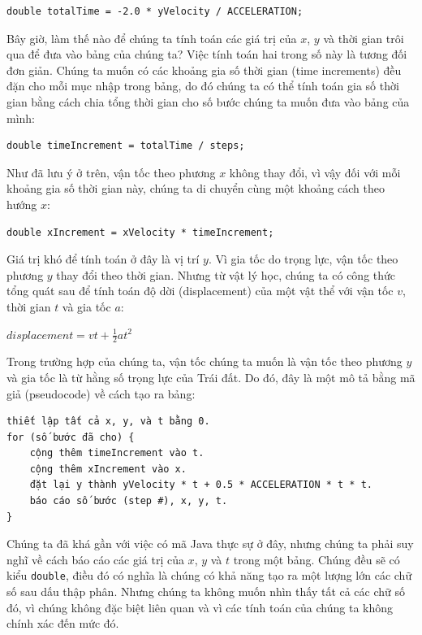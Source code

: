 \begin{verbatim}
double totalTime = -2.0 * yVelocity / ACCELERATION;
\end{verbatim}

Bây giờ, làm thế nào để chúng ta tính toán các giá trị của \(x\), \(y\)
và thời gian trôi qua để đưa vào bảng của chúng ta? Việc tính toán hai
trong số này là tương đối đơn giản. Chúng ta muốn có các khoảng gia số
thời gian (time increments) đều đặn cho mỗi mục nhập trong bảng, do đó
chúng ta có thể tính toán gia số thời gian bằng cách chia tổng thời gian
cho số bước chúng ta muốn đưa vào bảng của mình:

\begin{verbatim}
double timeIncrement = totalTime / steps;
\end{verbatim}

Như đã lưu ý ở trên, vận tốc theo phương \(x\) không thay đổi, vì vậy
đối với mỗi khoảng gia số thời gian này, chúng ta di chuyển cùng một
khoảng cách theo hướng \(x\):

\begin{verbatim}
double xIncrement = xVelocity * timeIncrement;
\end{verbatim}

Giá trị khó để tính toán ở đây là vị trí \(y\). Vì gia tốc do trọng lực,
vận tốc theo phương \(y\) thay đổi theo thời gian. Nhưng từ vật lý học,
chúng ta có công thức tổng quát sau để tính toán độ dời (displacement)
của một vật thể với vận tốc \(v\), thời gian \(t\) và gia tốc \(a\):

\(displacement = v t + \frac{1}{2} a t^2\)

Trong trường hợp của chúng ta, vận tốc chúng ta muốn là vận tốc theo
phương \(y\) và gia tốc là từ hằng số trọng lực của Trái đất. Do đó, đây
là một mô tả bằng mã giả (pseudocode) về cách tạo ra bảng:

\begin{verbatim}
thiết lập tất cả x, y, và t bằng 0.
for (số bước đã cho) {
    cộng thêm timeIncrement vào t.
    cộng thêm xIncrement vào x.
    đặt lại y thành yVelocity * t + 0.5 * ACCELERATION * t * t.
    báo cáo số bước (step #), x, y, t.
}
\end{verbatim}

Chúng ta đã khá gần với việc có mã Java thực sự ở đây, nhưng chúng ta
phải suy nghĩ về cách báo cáo các giá trị của \(x\), \(y\) và \(t\)
trong một bảng. Chúng đều sẽ có kiểu \texttt{double}, điều đó có nghĩa
là chúng có khả năng tạo ra một lượng lớn các chữ số sau dấu thập phân.
Nhưng chúng ta không muốn nhìn thấy tất cả các chữ số đó, vì chúng không
đặc biệt liên quan và vì các tính toán của chúng ta không chính xác đến
mức đó.

